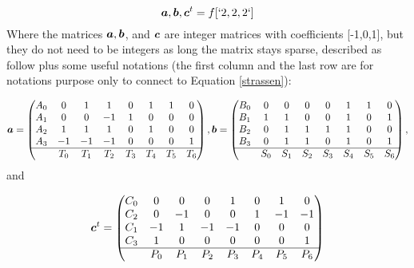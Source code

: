 \documentclass[acmsmall]{acmart}
\begin{document}
\begin{equation} 
  {\boldsymbol a}, {\boldsymbol b}, {\boldsymbol c}^t = f[`2,2,2`] \\
\end{equation}
Where the matrices ${\boldsymbol a}, {\boldsymbol b}$, and ${\boldsymbol c}$ are integer matrices
with coefficients [-1,0,1], but they do not need to be integers as
long the matrix stays sparse, described as follow plus some useful
notations (the first column and the last row are for notations purpose
only to connect to Equation \ref{strassen}):

\begin{equation}
  {\boldsymbol a}= 
  \begin{pmatrix}
    A_0 & 0   & 1  & 1 &  0 &  1&  1&  0 \\
    A_1 & 0   & 0  &-1 &  1 &  0&  0&  0 \\ 
    A_2 & 1   & 1  & 1 &  0 &  1&  0&  0 \\
    A_3 &-1   &-1  &-1 &  0 &  0&  0&  1 \\ \hline
        & T_0 &T_1 &T_2 &T_3&T_4 &T_5&T_6 \\
  \end{pmatrix},
  {\boldsymbol b}= 
  \begin{pmatrix}
    B_0 &0   & 0 & 0 & 0 & 1 & 1 & 0 \\
    B_1 &1   & 1 & 0 & 0 & 1 & 0 & 1 \\
    B_2 &0   & 1 & 1 & 1 & 1 & 0 & 0 \\
    B_3 &0   & 1 & 1 & 0 & 1 & 0 & 1 \\ \hline
        &S_0 &S_1&S_2&S_3 &S_4&S_5&S_6 \\
  \end{pmatrix},
\end{equation}
and

\begin{equation}
  {\boldsymbol c}^t =
  \begin{pmatrix}
    C_0 &  0&  0&  0&  1&  0&  1&  0 \\
    C_2 &  0& -1&  0&  0&  1& -1& -1 \\
    C_1 & -1&  1& -1& -1&  0&  0&  0 \\
    C_3 &  1&  0&  0&  0&  0&  0&  1 \\ \hline
        &P_0&P_1&P_2&P_3 &P_4&P_5&P_6 \\
  \end{pmatrix} 
\end{equation}
\end{document}
